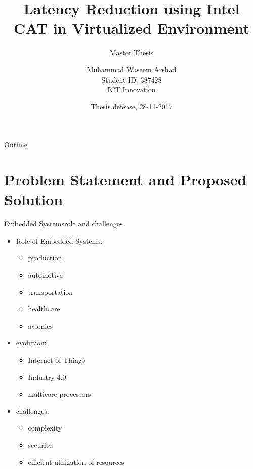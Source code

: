 \documentclass[10pt,hyperref={hyperfootnotes=false}, xcolor={usenames, dvipsnames}]{beamer}
\title{Latency Reduction using Intel CAT in Virtualized
Environment}
\subtitle{Master Thesis}
\author{Muhammad Waseem Arshad\inst{1} \\ Student ID: 387428 \\ ICT Innovation}
\institute[TU Berlin] %
{
  \inst{1}
  Department of Security in Telecommunications,\\
  Electrical Engineering and Computer Science Faculty,\\
  {Technische Universit{\"a}t Berlin}
}
\date{Thesis defense, 28-11-2017}
\begin{document}
\begin{frame}
  \titlepage
\end{frame}

\begin{frame}[allowframebreaks]{Outline}
  \small\tableofcontents
\end{frame}

\section{Problem Statement and Proposed Solution}
\begin{frame}{Embedded Systems}{role and challenges}
  \begin{itemize}
  \item {Role of Embedded Systems: \pause{}
			\begin{itemize}
			  \item {production}
			  \item {automotive}
			  \item {transportation}
		  	  \item {healthcare}
			  \item {avionics}
			 \end{itemize}
		}
		\pause{}
	
  \item {evolution:\pause{}
		 \begin{itemize}
      	  \item {Internet of Things} \pause{} 
		  \item {Industry 4.0} \pause{}
		  \item {multicore processors \pause{}}
	     \end{itemize}
		}
  \item {challenges: 
          \begin{itemize}
      	   \item {complexity} \pause{}
		   \item {security}  \pause{}
		   \item {efficient utilization of resources}
	      \end{itemize}
		}
  \end{itemize}
\end{frame}
\end{document}
